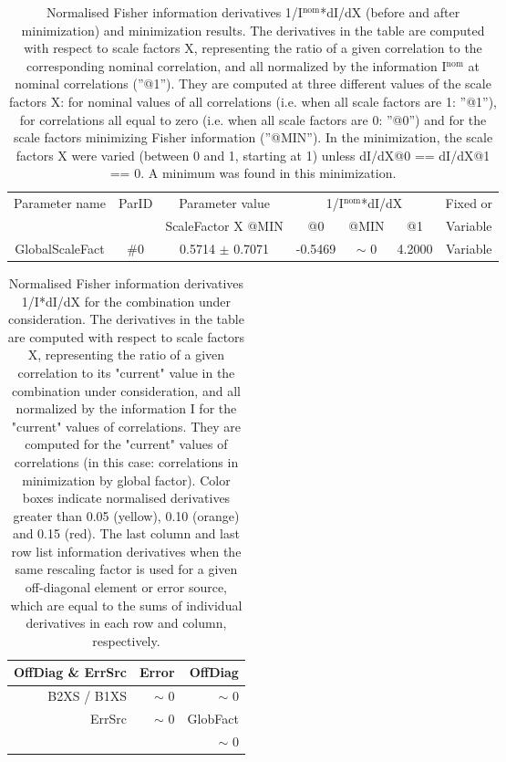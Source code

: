 \begin{table}[H]
\scriptsize
\begin{center}
\renewcommand{\arraystretch}{1.1}
\begin{tabular}{|c|c|c|ccc|c|}
\hline
Parameter name & ParID & Parameter value &\multicolumn{3}{|c|}{1/I$^\mathrm{nom}$*dI/dX} & Fixed or\\
 & & ScaleFactor X @MIN & @0 & @MIN & @1 & Variable\\
\hline
 {\tiny GlobalScaleFact} & \#0 &    0.5714 $\pm$    0.7071 &   -0.5469 & {\tiny $\sim$ }0 &    4.2000 & Variable \\
\hline
\end{tabular}
\renewcommand{\arraystretch}{1}
\caption{Normalised Fisher information derivatives 1/I$^\mathrm{nom}$*dI/dX (before and after minimization) and minimization results.  The derivatives in the table are computed with respect to scale factors X, representing the ratio of a given correlation to the corresponding nominal correlation, and all normalized by the information I$^\mathrm{nom}$ at nominal correlations (''@1''). They are computed at three different values of the scale factors X: for nominal values of all correlations (i.e. when all scale factors are 1: ''@1''), for correlations all equal to zero (i.e. when all scale factors are 0: ''@0'') and for the scale factors minimizing Fisher information (''@MIN''). In the minimization, the scale factors X were varied (between 0 and 1, starting at 1) unless dI/dX@0 == dI/dX@1 == 0. A minimum was found in this minimization.}
\end{center}
\end{table}
\begin{table}[H]
\scriptsize
\begin{center}
\renewcommand{\arraystretch}{1.1}
\begin{tabular}{|r|r|r|}
\hline
 OffDiag \& ErrSrc & {\tiny Error} & OffDiag\\
\hline
B2XS / B1XS &  {\tiny $\sim$ }0 &  {\tiny $\sim$ }0 \\
\hline
\multirow{2}{*}{ErrSrc} & \multirow{2}{*}{ {\tiny $\sim$ }0} & GlobFact\\
 & &  {\tiny $\sim$ }0 \\
\hline
\end{tabular}
\renewcommand{\arraystretch}{1}
\caption{Normalised Fisher information derivatives 1/I*dI/dX for the combination under consideration. The derivatives in the table are computed with respect to scale factors X, representing the ratio of a given correlation to its "current" value in the combination under consideration, and all normalized by the information I for the "current" values of correlations. They are computed for the "current" values of correlations (in this case: correlations in minimization by global factor). Color boxes indicate normalised derivatives greater than 0.05 (yellow), 0.10 (orange) and 0.15 (red). The last column and last row list information derivatives when the same rescaling factor is used for a given off-diagonal element or error source, which are equal to the sums of individual derivatives in each row and column, respectively.}
\end{center}
\end{table}

